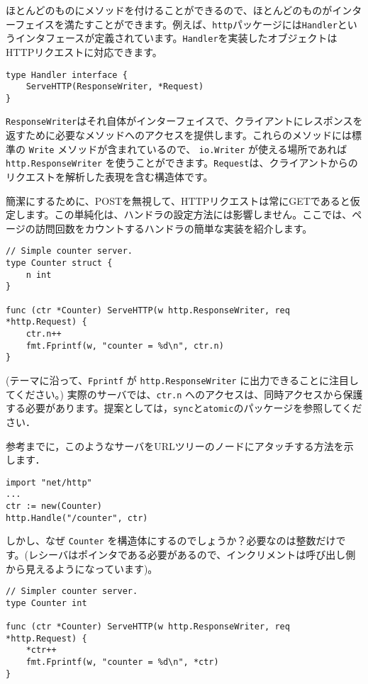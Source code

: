 \documentclass{jsarticle}
\begin{document}
ほとんどのものにメソッドを付けることができるので、ほとんどのものがインターフェイスを満たすことができます。例えば、\texttt{http}パッケージには\texttt{Handler}というインタフェースが定義されています。\texttt{Handler}を実装したオブジェクトはHTTPリクエストに対応できます。

\begin{lstlisting}[numbers=none]
type Handler interface {
    ServeHTTP(ResponseWriter, *Request)
}
\end{lstlisting}

\texttt{ResponseWriter}はそれ自体がインターフェイスで、クライアントにレスポンスを返すために必要なメソッドへのアクセスを提供します。これらのメソッドには標準の
\texttt{Write} メソッドが含まれているので、 \texttt{io.Writer}
が使える場所であれば \texttt{http.ResponseWriter}
を使うことができます。\texttt{Request}は、クライアントからのリクエストを解析した表現を含む構造体です。

簡潔にするために、POSTを無視して、HTTPリクエストは常にGETであると仮定します。この単純化は、ハンドラの設定方法には影響しません。ここでは、ページの訪問回数をカウントするハンドラの簡単な実装を紹介します。

\begin{lstlisting}[numbers=none]
// Simple counter server.
type Counter struct {
    n int
}

func (ctr *Counter) ServeHTTP(w http.ResponseWriter, req *http.Request) {
    ctr.n++
    fmt.Fprintf(w, "counter = %d\n", ctr.n)
}
\end{lstlisting}

(テーマに沿って、\texttt{Fprintf} が \texttt{http.ResponseWriter}
に出力できることに注目してください。) 実際のサーバでは、\texttt{ctr.n}
へのアクセスは、同時アクセスから保護する必要があります。提案としては，\texttt{sync}と\texttt{atomic}のパッケージを参照してください．

参考までに，このようなサーバをURLツリーのノードにアタッチする方法を示します．

\begin{lstlisting}[numbers=none]
import "net/http"
...
ctr := new(Counter)
http.Handle("/counter", ctr)
\end{lstlisting}

しかし、なぜ \texttt{Counter}
を構造体にするのでしょうか？必要なのは整数だけです。(レシーバはポインタである必要があるので、インクリメントは呼び出し側から見えるようになっています)。

\begin{lstlisting}[numbers=none]
// Simpler counter server.
type Counter int

func (ctr *Counter) ServeHTTP(w http.ResponseWriter, req *http.Request) {
    *ctr++
    fmt.Fprintf(w, "counter = %d\n", *ctr)
}
\end{lstlisting}
\end{document}
